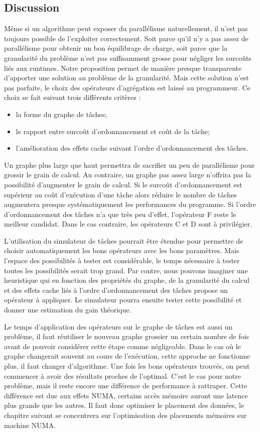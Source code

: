 \subsection{Discussion}
Même si un algorithme peut exposer du parallélisme naturellement, il n'est pas toujours possible de l'exploiter correctement.
%
Soit parce qu'il n'y a pas assez de parallélisme pour obtenir un bon équilibrage de charge, soit parce que la granularité du problème n'est pas suffisamment grosse pour négliger les surcoûts liés aux runtimes.
%
Notre proposition permet de manière presque transparente d'apporter une solution au problème de la granularité.
%
Mais cette solution n'est pas parfaite, le choix des opérateurs d'agrégation est laissé au programmeur.
%
Ce choix se fait suivant trois différents critères :
\begin{itemize}
  \item la forme du graphe de tâches;
  \item le rapport entre surcoût d'ordonnancement et coût de la tâche;
  \item l'amélioration des effets cache suivant l'ordre d'ordonnancement des tâches.
\end{itemize}
%
Un graphe plus large que haut permettra de sacrifier un peu de parallélisme pour grossir le grain de calcul.
%
Au contraire, un graphe pas assez large n'offrira pas la possibilité d'augmenter le grain de calcul.
%
Si le surcoût d'ordonnancement est supérieur au coût d'exécution d'une tâche alors réduire le nombre de tâches augmentera presque systématiquement les performances du programme.
%
Si l'ordre d'ordonnancement des tâches n'a que très peu d'effet, l'opérateur F reste le meilleur candidat.
%
Dans le cas contraire, les opérateurs C et D sont à privilégier.

L'utilisation du simulateur de tâches pourrait être étendue pour permettre de choisir automatiquement les bons opérateurs avec les bons paramètres.
%
Mais l'espace des possibilités à tester est considérable, le temps nécessaire à tester toutes les possibilités serait trop grand.
%
Par contre, nous pouvons imaginer une heuristique qui en fonction des propriétés du graphe, de la granularité du calcul et des effets cache liés à l'ordre d'ordonnancement des tâches propose un opérateur à appliquer.
%
Le simulateur pourra ensuite tester cette possibilité et donner une estimation du gain théorique.

Le temps d'application des opérateurs sur le graphe de tâches est aussi un problème, il faut réutiliser le nouveau graphe grossier un certain nombre de fois avant de pouvoir considérer cette étape comme négligeable.
%
Dans le cas où le graphe changerait souvent au cours de l'exécution, cette approche ne fonctionne plus, il faut changer d'algorithme.
%
Une fois les bons opérateurs trouvés, on peut commencer à avoir des résultats proches de l'optimal.
%
C'est le cas pour notre problème, mais il reste encore une différence de performance à rattraper.
%
Cette différence est due aux effets NUMA, certains accès mémoire auront une latence plus grande que les autres.
%
Il faut donc optimiser le placement des données, le chapitre suivant se concentrera sur l'optimisation des placements mémoires sur machine NUMA.

